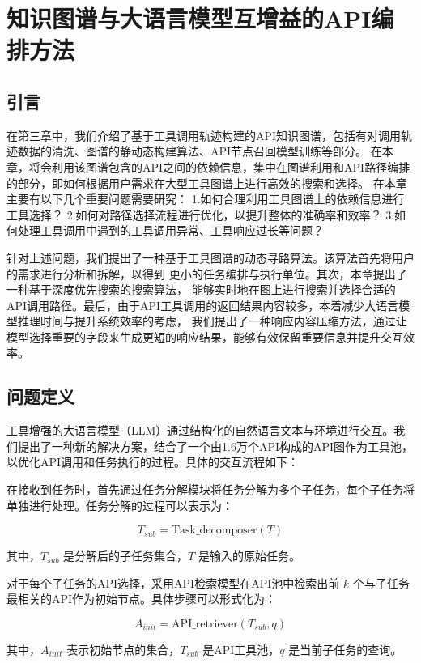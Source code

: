 \chapter{知识图谱与大语言模型互增益的API编排方法}

\section{引言}
\label{sec:intro}

\indent 在第三章中，我们介绍了基于工具调用轨迹构建的API知识图谱，包括有对调用轨迹数据的清洗、图谱的静动态构建算法、API节点召回模型训练等部分。
在本章，将会利用该图谱包含的API之间的依赖信息，集中在图谱利用和API路径编排的部分，即如何根据用户需求在大型工具图谱上进行高效的搜索和选择。
在本章主要有以下几个重要问题需要研究：
1.如何合理利用工具图谱上的依赖信息进行工具选择？
2.如何对路径选择流程进行优化，以提升整体的准确率和效率？
3.如何处理工具调用中遇到的工具调用异常、工具响应过长等问题？

\indent 针对上述问题，我们提出了一种基于工具图谱的动态寻路算法。该算法首先将用户的需求进行分析和拆解，以得到
更小的任务编排与执行单位。其次，本章提出了一种基于深度优先搜索的搜索算法，
能够实时地在图上进行搜索并选择合适的API调用路径。最后，由于API工具调用的返回结果内容较多，本着减少大语言模型推理时间与提升系统效率的考虑，
我们提出了一种响应内容压缩方法，通过让模型选择重要的字段来生成更短的响应结果，能够有效保留重要信息并提升交互效率。

\section{问题定义}

工具增强的大语言模型（LLM）通过结构化的自然语言文本与环境进行交互。我们提出了一种新的解决方案，结合了一个由1.6万个API构成的API图作为工具池，以优化API调用和任务执行的过程。具体的交互流程如下：

在接收到任务时，首先通过任务分解模块将任务分解为多个子任务，每个子任务将单独进行处理。任务分解的过程可以表示为：

\[
T_{sub} = \text{Task\_decomposer}(T) \tag{1}
\]

其中，\( T_{sub} \) 是分解后的子任务集合，\( T \) 是输入的原始任务。

对于每个子任务的API选择，采用API检索模型在API池中检索出前 \( k \) 个与子任务最相关的API作为初始节点。具体步骤可以形式化为：

\[
A_{init} = \text{API\_retriever}(T_{sub}, q) \tag{2}
\]

其中，\( A_{init} \) 表示初始节点的集合，\( T_{sub} \) 是API工具池，\( q \) 是当前子任务的查询。

